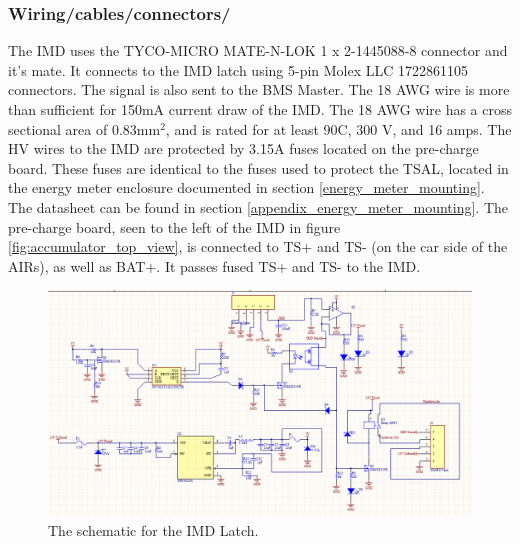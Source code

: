 \documentclass{article}
\begin{document}
\subsubsection{Wiring/cables/connectors/}

The  IMD uses the TYCO-MICRO MATE-N-LOK 1 x 2-1445088-8 connector and it's mate. It connects to the IMD latch using 5-pin Molex LLC 1722861105 connectors. The signal is also sent to the BMS Master. The 18 AWG wire is more than sufficient for 150mA current draw of the IMD. The 18 AWG wire has a cross sectional area of 0.83mm$^2$, and is rated for at least 90\textdegree C, 300 V, and 16 amps. The HV wires to the IMD are protected by 3.15A fuses located on the pre-charge board. These fuses are identical to the fuses used to protect the TSAL, located in the energy meter enclosure documented in section \ref{energy_meter_mounting}. The datasheet can be found in section \ref{appendix_energy_meter_mounting}. The pre-charge board, seen to the left of the IMD in figure \ref{fig:accumulator_top_view}, is connected to TS+ and TS- (on the car side of the AIRs), as well as BAT+. It passes fused TS+ and TS- to the IMD. 


\begin{figure} [!ht]
	\centering 
	\includegraphics[width=1\textwidth]{IMD_Latch_Rev2_AltiumSchematic.PNG}
	\caption{The schematic for the IMD Latch.}
	\label{fig:IMDLatch_Schematic}
\end{figure}
\end{document}
